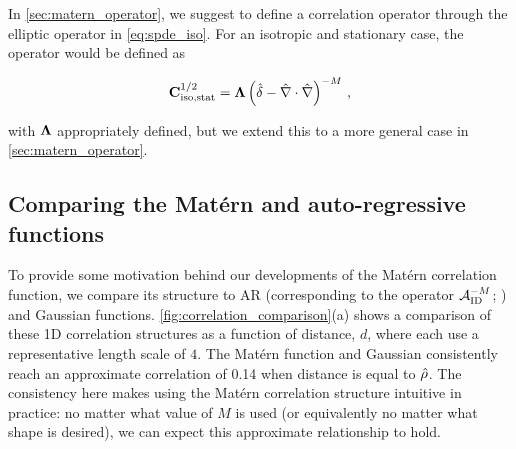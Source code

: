 
In \cref{sec:matern_operator}, we suggest to define a correlation operator through the
elliptic operator in \cref{eq:spde_iso}.
For an isotropic and stationary case, the operator would be defined as
\begin{linenomath*}\begin{equation}
    \mathbf{C}^{1/2}_\text{iso,stat} = \mathbf{\Lambda} \left(\hat{\delta} -
    \hat{\nabla}\cdot\hat{\nabla}\right)^{-M} \, ,
    \label{eq:matern_corr_isostat}
\end{equation}\end{linenomath*}
with $\mathbf{\Lambda}$ appropriately defined, but we extend this to a more general
case in \cref{sec:matern_operator}.


\subsection{Comparing the Mat\'ern and auto-regressive functions}
\label{ssec:correlation_comparison}

To provide some motivation behind our developments of the Mat\'ern
correlation function, we compare its structure to AR
(corresponding to the operator $\mathcal{A}_\text{ID}^{-M}$; \citep{mirouze_representation_2010})
and Gaussian functions.
\cref{fig:correlation_comparison}(a) shows a comparison of these 1D correlation
structures as a function of distance, $d$, where each use a representative length
scale of $4$.
The Mat\'ern function and Gaussian consistently reach an approximate correlation
of 0.14 when distance is equal to $\hat{\rho}$.
The consistency here makes using the Mat\'ern correlation structure intuitive in
practice: no matter what value of $M$ is used (or equivalently no matter what
shape is desired), we can expect this approximate relationship to hold.

